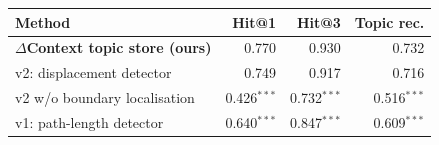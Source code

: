 \begin{tabular}{lrrr}
\toprule
Method & Hit@1 & Hit@3 & Topic rec. \\
\midrule
\textbf{$\Delta$Context topic store (ours)} & 0.770 & 0.930 & 0.732 \\
\quad v2: displacement detector & 0.749 & 0.917 & 0.716 \\
\quad v2 w/o boundary localisation & 0.426$^{***}$ & 0.732$^{***}$ & 0.516$^{***}$ \\
\quad v1: path-length detector & 0.640$^{***}$ & 0.847$^{***}$ & 0.609$^{***}$ \\
\bottomrule
\end{tabular}
